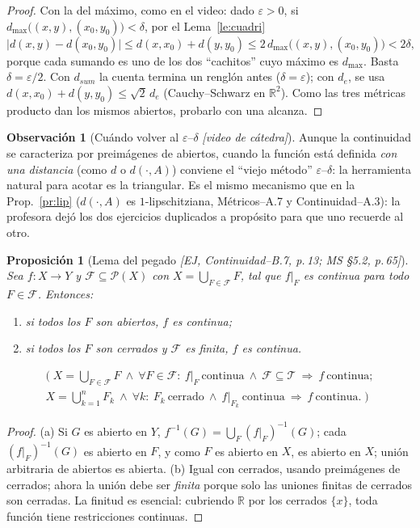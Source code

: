 \documentclass[11pt,a4paper]{article}
\newcommand{\lgc}[1]{\par\vspace{-3pt}\begin{gather*}\big(\;#1\;\big)\end{gather*}\vspace{-6pt}}
\theoremstyle{definition}
\newtheorem{observacion}[definicion]{Observación}
\theoremstyle{plain}
\newtheorem{proposicion}[definicion]{Proposición}
\newcommand{\fnt}[1]{{\normalfont\small\itshape\color{gray!150!black}[#1]}}
\newcommand{\R}{\mathbb{R}}
\newcommand{\tp}{\mathcal{T}}
\begin{document}
\begin{proof}
Con la del máximo, como en el video: dado $\varepsilon>0$, si $d_{\max}\big((x,y),(x_0,y_0)\big)<\delta$, por el Lema~\ref{le:cuadri}
\[
\big|d(x,y)-d(x_0,y_0)\big|\le d(x,x_0)+d(y,y_0)\le 2\,d_{\max}\big((x,y),(x_0,y_0)\big)<2\delta,
\]
porque cada sumando es uno de los dos ``cachitos'' cuyo máximo es $d_{\max}$. Basta $\delta=\varepsilon/2$. Con $d_{sum}$ la cuenta termina un renglón antes ($\delta=\varepsilon$); con $d_e$, se usa $d(x,x_0)+d(y,y_0)\le\sqrt2\,d_e$ (Cauchy--Schwarz en $\R^2$). Como las tres métricas producto dan los mismos abiertos, probarlo con una alcanza.
\end{proof}

\begin{observacion}[Cuándo volver al $\varepsilon$--$\delta$ \fnt{video de cátedra}]
Aunque la continuidad se caracteriza por preimágenes de abiertos, cuando la función está definida \emph{con una distancia} (como $d$ o $d(\cdot,A)$) conviene el ``viejo método'' $\varepsilon$--$\delta$: la herramienta natural para acotar es la triangular. Es el mismo mecanismo que en la Prop.~\ref{pr:lip} ($d(\cdot,A)$ es $1$-lipschitziana, Métricos--A.7 y Continuidad--A.3): la profesora dejó los dos ejercicios duplicados a propósito para que uno recuerde al otro.
\end{observacion}

\begin{proposicion}[Lema del pegado \fnt{EJ, Continuidad--B.7, p.\,13; MS \S5.2, p.\,65}]
Sea $f:X\to Y$ y $\mathcal F\subseteq\mathcal P(X)$ con $X=\bigcup_{F\in\mathcal F}F$, tal que $f|_F$ es continua para todo $F\in\mathcal F$. Entonces:
\begin{enumerate}[label=(\alph*),leftmargin=2.2em,itemsep=0pt]
\item si todos los $F$ son \emph{abiertos}, $f$ es continua;
\item si todos los $F$ son \emph{cerrados} y $\mathcal F$ es \emph{finita}, $f$ es continua.
\end{enumerate}
\lgc{X=\bigcup_{F\in\mathcal F}F\ \wedge\ \forall F\in\mathcal F:\ f|_F\ \text{continua}\ \wedge\ \mathcal F\subseteq\tp\ \Rightarrow\ f\ \text{continua};\\
X=\bigcup_{k=1}^{n}F_k\ \wedge\ \forall k:\ F_k\ \text{cerrado}\ \wedge\ f|_{F_k}\ \text{continua}\ \Rightarrow\ f\ \text{continua}.}
\end{proposicion}

\begin{proof}
(a) Si $G$ es abierto en $Y$, $f^{-1}(G)=\bigcup_F (f|_F)^{-1}(G)$; cada $(f|_F)^{-1}(G)$ es abierto en $F$, y como $F$ es abierto en $X$, es abierto en $X$; unión arbitraria de abiertos es abierta. (b) Igual con cerrados, usando preimágenes de cerrados; ahora la unión debe ser \emph{finita} porque solo las uniones finitas de cerrados son cerradas. La finitud es esencial: cubriendo $\R$ por los cerrados $\{x\}$, toda función tiene restricciones continuas.
\end{proof}
\end{document}
